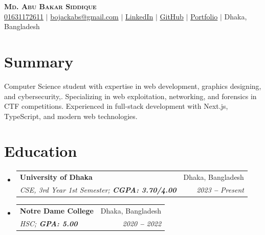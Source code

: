 \documentclass[letterpaper,11pt]{article}
\makeatletter
\newcommand{\resumeSubheading}[4]{
  \vspace{-2pt}\item
    \begin{tabular*}{0.97\textwidth}[t]{l@{\extracolsep{\fill}}r}
      \textbf{#1} & #2 \\
      \textit{\small#3} & \textit{\small #4} \\
    \end{tabular*}\vspace{-7pt}
}
\newcommand{\resumeSubHeadingListStart}{\begin{itemize}[leftmargin=0.15in, label={}]}
\newcommand{\resumeSubHeadingListEnd}{\end{itemize}}
\makeatother
\begin{document}

\begin{center}
	\textbf{\Huge \scshape Md. Abu Bakar Siddique} \\ \vspace{3pt}
	\small
	\faMobile \hspace{.5pt} \href{tel:+8801XXXXXXXXX}{01631172611}
	$|$
	\faAt \hspace{.5pt} \href{mailto:abs@example.com}{bojackabs@gmail.com}
	$|$
	\faLinkedinSquare \hspace{.5pt} \href{https://www.linkedin.com/in/md-abu-bakar-siddique-59b881237/}{LinkedIn}
	$|$
	\faGithub \hspace{.5pt} \href{https://github.com/Abs-Futy7}{GitHub}
	$|$
        \faGlobe \hspace{.5pt} \href{https://abs-portfolio-ten.vercel.app/}{Portfolio}
        $|$
	\faMapMarker \hspace{.5pt} Dhaka, Bangladesh
\end{center}


\section{Summary}
\vspace{3pt}
\resumeSubHeadingListStart
\small{\item{
	Computer Science student with expertise in  web development, graphics designing, and cybersecurity,. Specializing in web exploitation, networking, and forensics in CTF competitions. Experienced in full-stack development with Next.js, TypeScript, and modern web technologies.
}}
\resumeSubHeadingListEnd


\section{Education}
\vspace{3pt}
\resumeSubHeadingListStart
    
\resumeSubheading
{University of Dhaka}{Dhaka, Bangladesh}
{CSE, 3rd Year 1st Semester;   \textbf{CGPA: 3.70/4.00}}{2023 \textbf{--} Present}
    
\resumeSubheading
{Notre Dame College}{Dhaka, Bangladesh}
{HSC;   \textbf{GPA: 5.00}}{2020 \textbf{--} 2022}
    
\resumeSubHeadingListEnd
\end{document}
